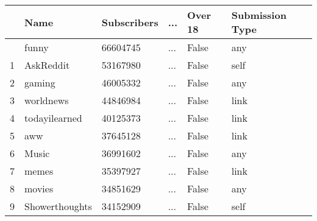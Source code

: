 \documentclass[
  12pt,
  letterpaper,
  DIV=11,
  numbers=noendperiod]{scrartcl}
\begin{document}
\begin{longtable}[]{@{}llllll@{}}
\toprule\noalign{}
& Name & Subscribers & ... & Over 18 & Submission Type \\
\midrule\noalign{}
\endhead
\bottomrule\noalign{}
\endlastfoot
0 & funny & 66604745 & ... & False & any \\
1 & AskReddit & 53167980 & ... & False & self \\
2 & gaming & 46005332 & ... & False & any \\
3 & worldnews & 44846984 & ... & False & link \\
4 & todayilearned & 40125373 & ... & False & link \\
5 & aww & 37645128 & ... & False & link \\
6 & Music & 36991602 & ... & False & any \\
7 & memes & 35397927 & ... & False & link \\
8 & movies & 34851629 & ... & False & any \\
9 & Showerthoughts & 34152909 & ... & False & self \\
\end{longtable}
\end{document}
